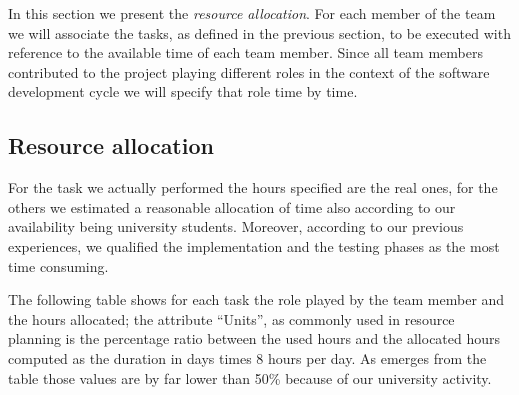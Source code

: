 In this section we present the \emph{resource allocation}. For each
member of the team we will associate the tasks, as defined in the
previous section, to be executed with reference to the available time
of each team member. Since all team members contributed to the project
playing different roles in the context of the software development
cycle we will specify that role time by time.


\subsection{Resource allocation}

For the task we actually performed the hours specified are the real
ones, for the others we estimated a reasonable allocation of time
also according to our availability being university students. Moreover,
according to our previous experiences, we qualified the implementation
and the testing phases as the most time consuming. 

The following table shows for each task the role played by the team
member and the hours allocated; the attribute ``Units'', as commonly
used in resource planning is the percentage ratio between the used
hours and the allocated hours computed as the duration in days times
8 hours per day. As emerges from the table those values are by far
lower than 50\% because of our university activity.

